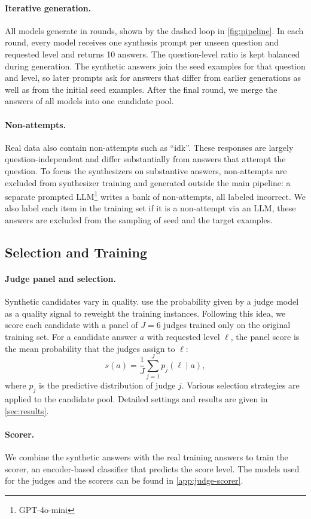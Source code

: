 \paragraph{Iterative generation.}
All models generate in rounds, shown by the dashed loop in \autoref{fig:pipeline}. In each round, every model receives one synthesis prompt per unseen question and requested level and returns 10 answers. The question-level ratio is kept balanced during generation. The synthetic answers join the seed examples for that question and level, so later prompts ask for answers that differ from earlier generations as well as from the initial seed examples. After the final round, we merge the answers of all models into one candidate pool.

\paragraph{Non-attempts.}
Real data also contain non-attempts such as ``idk''. These responses are largely question-independent and differ substantially from answers that attempt the question. To focus the synthesizers on substantive answers, non-attempts are excluded from synthesizer training and generated outside the main pipeline: a separate prompted LLM\footnote{GPT-4o-mini} writes a bank of non-attempts, all labeled incorrect. We also label each item in the training set if it is a non-attempt via an LLM, these answers are excluded from the sampling of seed and the target examples. 

\subsection{Selection and Training}
\label{sec:selection-training}

\paragraph{Judge panel and selection.}


Synthetic candidates vary in quality. \citet{zouFuseGenPLMFusion2024} use the probability given by a judge model as a quality signal to reweight the training instances. Following this idea, we score each candidate with a panel of $J = 6$ judges trained only on the original training set. For a candidate answer $a$ with requested level $\ell$, the panel score is the mean probability that the judges assign to $\ell$:
\begin{equation}
s(a) = \frac{1}{J} \sum_{j=1}^{J} p_j(\ell \mid a),
\label{eq:panel-score}
\end{equation}
where $p_j$ is the predictive distribution of judge $j$.
Various selection strategies are applied to the candidate pool. Detailed settings and results are given in \autoref{sec:results}.



\paragraph{Scorer.}
We combine the synthetic answers with the real training answers to train the scorer, an encoder-based classifier that predicts the score level. The models used for the judges and the scorers can be found in \autoref{app:judge-scorer}.
